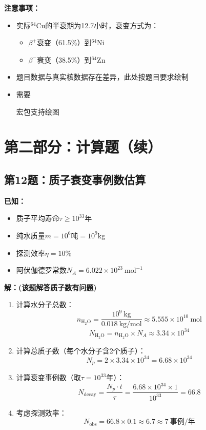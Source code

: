 \documentclass{article}
\begin{document}
\textbf{注意事项：}
\begin{itemize}
  \item 实际$^{64}\mathrm{Cu}$的半衰期为12.7小时，衰变方式为：
  \begin{itemize}
    \item $\beta^+$衰变（61.5\%）到$^{64}\mathrm{Ni}$
    \item $\beta^-$衰变（38.5\%）到$^{64}\mathrm{Zn}$
  \end{itemize}
  \item 题目数据与真实核数据存在差异，此处按题目要求绘制
  \item 需要\usepackage{tikz}宏包支持绘图
\end{itemize}

\section*{第二部分：计算题（续）}

\subsection*{第12题：质子衰变事例数估算}
\textbf{已知：}
\begin{itemize}
  \item 质子平均寿命$\tau \geq 10^{33}$年
  \item 纯水质量$m=10^6$吨$=10^9$kg
  \item 探测效率$\eta=10\%$
  \item 阿伏伽德罗常数$N_A=6.022 \times 10^{23}\ \mathrm{mol^{-1}}$
\end{itemize}

\textbf{解：(该题解答质子数有问题)}
\begin{enumerate}
  \item 计算水分子总数：
  $$
  n_{\mathrm{H_2O}} = \frac{10^9\ \mathrm{kg}}{0.018\ \mathrm{kg/mol}} \approx 5.555 \times 10^{10}\ \mathrm{mol}
  $$
  $$
  N_{\mathrm{H_2O}} = n_{\mathrm{H_2O}} \times N_A \approx 3.34 \times 10^{34}
  $$
  
  \item 计算总质子数（每个水分子含2个质子）：
  $$
  N_p = 2 \times 3.34 \times 10^{34} = 6.68 \times 10^{34}
  $$
  
  \item 计算衰变事例数（取$\tau=10^{33}$年）：
  $$
  N_{\mathrm{decay}} = \frac{N_p \cdot t}{\tau} = \frac{6.68 \times 10^{34} \times 1}{10^{33}} = 66.8
  $$
  
  \item 考虑探测效率：
  $$
  N_{\mathrm{obs}} = 66.8 \times 0.1 \approx 6.7 \approx 7\ \mathrm{事例/年}
  $$
\end{enumerate}
\end{document}
